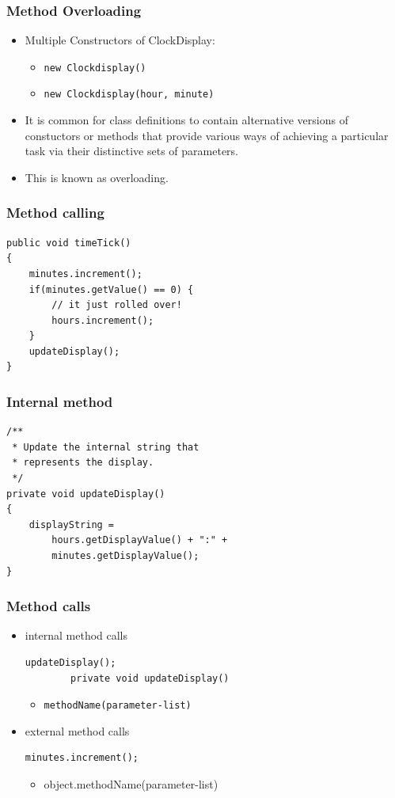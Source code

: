 \documentclass{beamer}
\begin{document}
\begin{frame}
\frametitle{Method Overloading}
\begin{itemize}
\item Multiple Constructors of ClockDisplay:
\begin{itemize}
\item \lstinline!new Clockdisplay()‏!
\item \lstinline!new Clockdisplay(hour, minute)‏!
\end{itemize}
\item It is common for class definitions to contain alternative versions of constuctors or methods that provide various ways of achieving a particular task via their distinctive sets of parameters.
\item This is known as \alert{overloading}.
\end{itemize}
\end{frame}

\begin{frame}[fragile]
\frametitle{Method calling}
\begin{lstlisting}
public void timeTick()‏
{
    minutes.increment();
    if(minutes.getValue() == 0) { 
        // it just rolled over!
        hours.increment();
    }
    updateDisplay();
}
\end{lstlisting}
\end{frame}

\begin{frame}[fragile]
\frametitle{Internal method}
\begin{lstlisting}
/**
 * Update the internal string that
 * represents the display.
 */
private void updateDisplay()‏
{
    displayString = 
        hours.getDisplayValue() + ":" + 
        minutes.getDisplayValue();
}
\end{lstlisting}
\end{frame}

\begin{frame}[fragile]
\frametitle{Method calls}
\begin{itemize}
\item internal method calls
\begin{lstlisting}[linewidth=6cm]
		updateDisplay();
		private void updateDisplay()‏
\end{lstlisting}
\begin{itemize}
\item \lstinline!methodName(parameter-list)!		
\end{itemize}
\item external method calls
\begin{lstlisting}[linewidth=6cm]
		minutes.increment();
\end{lstlisting}
\begin{itemize}
\item object.methodName(parameter-list)‏
\end{itemize}
\end{itemize}
\end{frame}
\end{document}
